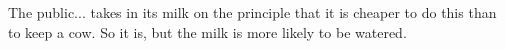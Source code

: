 \documentclass[MAIN]{subfiles}
\begin{document}
The public... takes in its milk on the principle that it is cheaper to do this than to keep a cow. So it is, but the milk is more likely to be watered.
\end{document}
